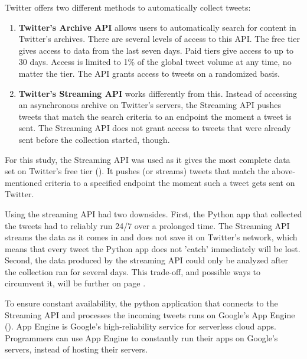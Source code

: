 
Twitter offers two different methods to automatically collect tweets:
\begin{enumerate}
    \item \textbf{Twitter's Archive API} allows users to automatically search for content in Twitter's archives. There are several levels of access to this API. The free tier gives access to data from the last seven days. Paid tiers give access to up to 30 days. Access is limited to 1\% of the global tweet volume at any time, no matter the tier. The API grants access to tweets on a randomized basis.
    \item \textbf{Twitter's Streaming API} works differently from this. Instead of accessing an asynchronous archive on Twitter's servers, the Streaming API pushes tweets that match the search criteria to an endpoint the moment a tweet is sent. The Streaming API does not grant access to tweets that were already sent before the collection started, though.
\end{enumerate}

For this study, the Streaming API was used as it gives the most complete data set on Twitter's free tier (\cite{brunsTwitterDataWhat2014}). It pushes (or streams) tweets that match the above-mentioned criteria to a specified endpoint the moment such a tweet gets sent on Twitter. %

Using the streaming API had two downsides. First, the Python app that collected the tweets had to reliably run 24/7 over a prolonged time. The Streaming API streams the data as it comes in and does not save it on Twitter's network, which means that every tweet the Python app does not 'catch' immediately will be lost. Second, the data produced by the streaming API could only be analyzed after the collection ran for several days. This trade-off, and possible ways to circumvent it, will be further on page \pageref{sec:fixedDataSet}.

To ensure constant availability, the python application that connects to the Streaming API and processes the incoming tweets runs on Google's App Engine (\cite{googleAppEngineApplication2020}). App Engine is Google's high-reliability service for serverless cloud apps. Programmers can use App Engine to constantly run their apps on Google's servers, instead of hosting their servers.

